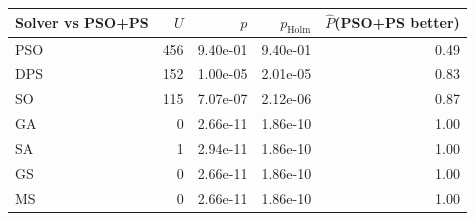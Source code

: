 \begin{tabular}{lrrrr}
\toprule
Solver vs PSO+PS & $U$ & $p$ & $p_{\mathrm{Holm}}$ & $\hat{P}$(PSO+PS better)\\
\midrule
PSO & 456 & 9.40e-01 & 9.40e-01 & 0.49\\
DPS & 152 & 1.00e-05 & 2.01e-05 & 0.83\\
SO & 115 & 7.07e-07 & 2.12e-06 & 0.87\\
GA & 0 & 2.66e-11 & 1.86e-10 & 1.00\\
SA & 1 & 2.94e-11 & 1.86e-10 & 1.00\\
GS & 0 & 2.66e-11 & 1.86e-10 & 1.00\\
MS & 0 & 2.66e-11 & 1.86e-10 & 1.00\\
\bottomrule
\end{tabular}

